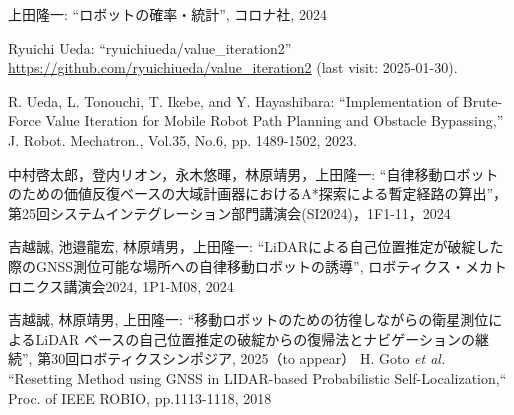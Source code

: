 \documentclass[twocolumn,9pt]{jsproceedings}
\begin{document}
\begin{thebibliography}{99}
    上田隆一: ``ロボットの確率・統計'', コロナ社, 2024

    Ryuichi Ueda: ``ryuichiueda/value\_iteration2'' \url{https://github.com/ryuichiueda/value_iteration2} (last visit: 2025-01-30).

  R. Ueda, L. Tonouchi, T. Ikebe, and Y. Hayashibara: ``Implementation of Brute-Force Value Iteration for Mobile Robot Path Planning and Obstacle Bypassing,''
  J. Robot. Mechatron., Vol.35, No.6, pp. 1489-1502, 2023.

    中村啓太郎，登内リオン，永木悠暉，林原靖男，上田隆一: ``自律移動ロボットのための価値反復ベースの大域計画器におけるA*探索による暫定経路の算出''，第25回システムインテグレーション部門講演会(SI2024)，1F1-11，2024

	  吉越誠, 池邉龍宏, 林原靖男，上田隆一: ``LiDARによる自己位置推定が破綻した際のGNSS測位可能な場所への自律移動ロボットの誘導'', ロボティクス・メカトロニクス講演会2024, 1P1-M08, 2024

	  吉越誠, 林原靖男, 上田隆一: ``移動ロボットのための彷徨しながらの衛星測位によるLiDAR ベースの自己位置推定の破綻からの復帰法とナビゲーションの継続'', 第30回ロボティクスシンポジア, 2025（to appear）
	  H. Goto {\it et al.} ``Resetting Method using GNSS in LIDAR-based Probabilistic Self-Localization,`` Proc. of IEEE ROBIO, pp.1113-1118, 2018






\end{thebibliography}
\end{document}
